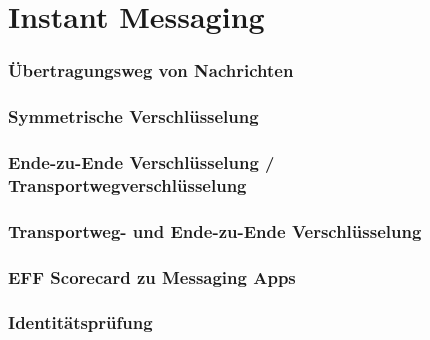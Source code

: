 \section{Instant Messaging}

\begin{frame}
  \frametitle{Übertragungsweg von Nachrichten}
\end{frame}

\begin{frame}
  \frametitle{Symmetrische Verschlüsselung}
\end{frame}

\begin{frame}
  \frametitle{Ende-zu-Ende Verschlüsselung / Transportwegverschlüsselung}
\end{frame}

\begin{frame}
  \frametitle{Transportweg- und Ende-zu-Ende Verschlüsselung}
\end{frame}

\begin{frame}
  \frametitle{EFF Scorecard zu Messaging Apps}
\end{frame}

\begin{frame}
  \frametitle{Identitätsprüfung}
\end{frame}